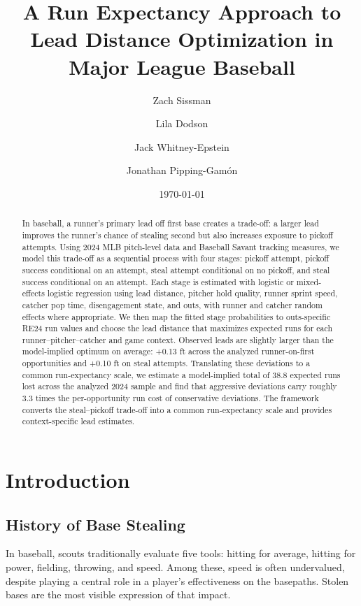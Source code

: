 \documentclass[12pt,letterpaper]{article}
\title{A Run Expectancy Approach to Lead Distance Optimization in Major League Baseball}
\author[1]{Zach Sissman}
\author[2]{Lila Dodson}
\author[3]{Jack Whitney-Epstein}
\author[4]{Jonathan Pipping-Gam\'on}
\affil[1]{\small Community School of Naples, Naples, FL}
\affil[2]{\small San Francisco University High School, San Francisco, CA}
\affil[3]{\small The Brunswick School, Greenwich, CT}
\affil[4]{\small Department of Statistics \& Data Science, University of Pennsylvania}
\date{\today}
\begin{document}
\maketitle

\begin{abstract}
In baseball, a runner's primary lead off first base creates a trade-off: a larger lead improves the runner's chance of stealing second but also increases exposure to pickoff attempts. Using 2024 MLB pitch-level data and Baseball Savant tracking measures, we model this trade-off as a sequential process with four stages: pickoff attempt, pickoff success conditional on an attempt, steal attempt conditional on no pickoff, and steal success conditional on an attempt. Each stage is estimated with logistic or mixed-effects logistic regression using lead distance, pitcher hold quality, runner sprint speed, catcher pop time, disengagement state, and outs, with runner and catcher random effects where appropriate. We then map the fitted stage probabilities to outs-specific RE24 run values and choose the lead distance that maximizes expected runs for each runner--pitcher--catcher and game context. Observed leads are slightly larger than the model-implied optimum on average: +0.13 ft across the analyzed runner-on-first opportunities and +0.10 ft on steal attempts. Translating these deviations to a common run-expectancy scale, we estimate a model-implied total of 38.8 expected runs lost across the analyzed 2024 sample and find that aggressive deviations carry roughly 3.3 times the per-opportunity run cost of conservative deviations. The framework converts the steal--pickoff trade-off into a common run-expectancy scale and provides context-specific lead estimates.
\end{abstract}

\section{Introduction}

\subsection{History of Base Stealing}

In baseball, scouts traditionally evaluate five tools: hitting for average, hitting for power, fielding, throwing, and speed. Among these, speed is often undervalued, despite playing a central role in a player's effectiveness on the basepaths. Stolen bases are the most visible expression of that impact.
\end{document}
